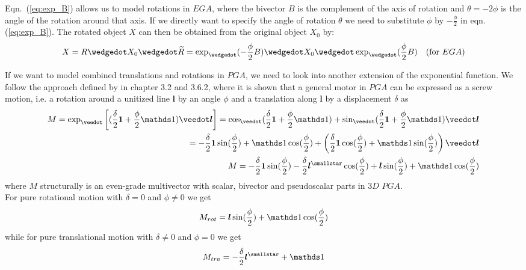 Eqn.~(\ref{eq:exp_B}) allows us to model rotations in $EGA$, where the bivector $B$ is the
complement of the axis of rotation and $\theta = -2\phi$ is the angle of the rotation
around that axis. If we directly want to specify the angle of rotation $\theta$ we need to
substitute $\phi$ by $-\frac{\phi}{2}$ in eqn. (\ref{eq:exp_B}). The rotated object $X$
can then be obtained from the original object $X_0$ by:
\begin{equation}
    X = R \wedgedot X_0 \wedgedot \rev{R} = \exp_\wedgedot(-\frac{\phi}{2} B )
    \wedgedot X_0 \wedgedot \exp_\wedgedot(\frac{\phi}{2} B) \quad (\text{for $EGA$})
\end{equation}

If we want to model combined translations and rotations in $PGA$, we need to look into
another extension of the exponential function. We follow the approach defined by
\cite{Lengyel_pga-illuminated:2024} in chapter 3.2 and 3.6.2, where it is shown that a
general motor in $PGA$ can be expressed as a screw motion, i.e. a rotation around a
unitized line $\bm{l}$ by an angle $\phi$ and a translation along $\bm{l}$ by a
displacement $\delta$ as
\begin{eqnarray}
    M = \exp_\veedot\left[(\frac{\delta}{2} \bm{1} + \frac{\phi}{2}\ps) \veedot \bm{l}
    \right]=
    \cos_\veedot(\frac{\delta}{2} \bm{1} + \frac{\phi}{2} \ps) +
    \sin_\veedot(\frac{\delta}{2} \bm{1} + \frac{\phi}{2} \ps) \veedot \bm{l} \nonumber \\
    = -\frac{\delta}{2} \bm{1} \sin(\frac{\phi}{2}) + \ps\cos(\frac{\phi}{2}) + \left(
     \frac{\delta}{2} \bm{1} \cos(\frac{\phi}{2}) + \ps\sin(\frac{\phi}{2}) \right)
     \veedot \bm{l} \nonumber \\
  M = -\frac{\delta}{2}\bm{1}\sin(\frac{\phi}{2}) - \frac{\delta}{2}
      \rightweightdual{\bm{l}}\cos(\frac{\phi}{2}) +
      \bm{l}\sin(\frac{\phi}{2}) + \ps\cos(\frac{\phi}{2}) 
\label{eq:rexp_pga_motor}
\end{eqnarray}
where $M$ structurally is an even-grade multivector with scalar, bivector and pseudoscalar
parts in $3D$ $PGA$. \\

For pure rotational motion with $\delta = 0$ and $\phi \ne 0$ we get
\begin{eqnarray}
  M_{rot} = \bm{l}\sin(\frac{\phi}{2}) + \ps\cos(\frac{\phi}{2}) 
\label{eq:rexp_pga_motor_rotation}
\end{eqnarray}
while for pure translational motion with $\delta \ne 0$ and $\phi = 0$ we get
\begin{eqnarray}
  M_{tra} = -\frac{\delta}{2}\rightweightdual{\bm{l}} + \ps 
\label{eq:rexp_pga_motor_translation}
\end{eqnarray}


